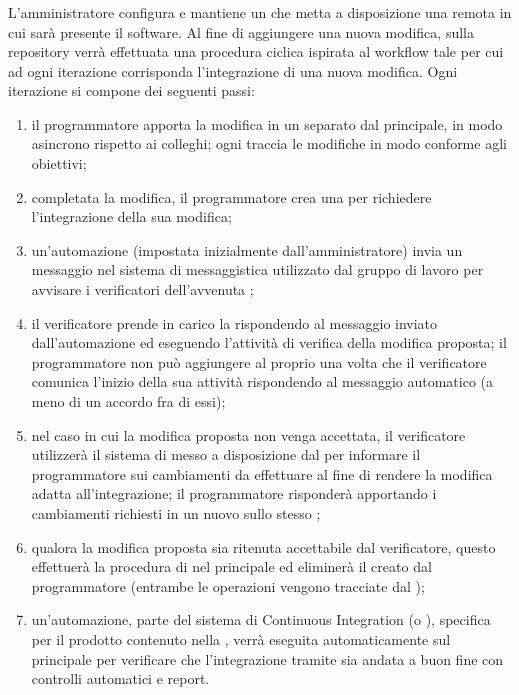     \subsubsection{}
    L'amministratore configura e mantiene un  che metta a disposizione una  remota in cui sarà presente il software. Al fine di aggiungere una nuova modifica, sulla repository verrà effettuata una procedura ciclica ispirata al workflow  tale per cui ad ogni iterazione corrisponda l'integrazione di una nuova modifica. Ogni iterazione si compone dei seguenti passi:
    \begin{enumerate}
    \item il programmatore apporta la modifica in un  separato dal  principale, in modo asincrono rispetto ai colleghi; ogni  traccia le modifiche in modo conforme agli obiettivi;
    \item completata la modifica, il programmatore crea una  per richiedere l'integrazione della sua modifica;
    \item un'automazione (impostata inizialmente dall'amministratore) invia un messaggio nel sistema di messaggistica utilizzato dal gruppo di lavoro per avvisare i verificatori dell'avvenuta ;
    \item il verificatore prende in carico la  rispondendo al messaggio inviato dall'automazione ed eseguendo l'attività di verifica della modifica proposta; il programmatore non può aggiungere  al proprio  una volta che il verificatore comunica l'inizio della sua attività rispondendo al messaggio automatico (a meno di un accordo fra di essi);
    \item nel caso in cui la modifica proposta non venga accettata, il verificatore utilizzerà il sistema di  messo a disposizione dal  per informare il programmatore sui cambiamenti da effettuare al fine di rendere la modifica adatta all'integrazione; il programmatore risponderà apportando i cambiamenti richiesti in un nuovo  sullo stesso ;
    \item qualora la modifica proposta sia ritenuta accettabile dal verificatore, questo effettuerà la procedura di  nel  principale ed eliminerà il  creato dal programmatore (entrambe le operazioni vengono tracciate dal );
    \item un'automazione, parte del sistema di Continuous Integration (o ), specifica per il prodotto contenuto nella , verrà eseguita automaticamente sul  principale per verificare che l'integrazione tramite  sia andata a buon fine con controlli automatici e report.
    \end{enumerate}
